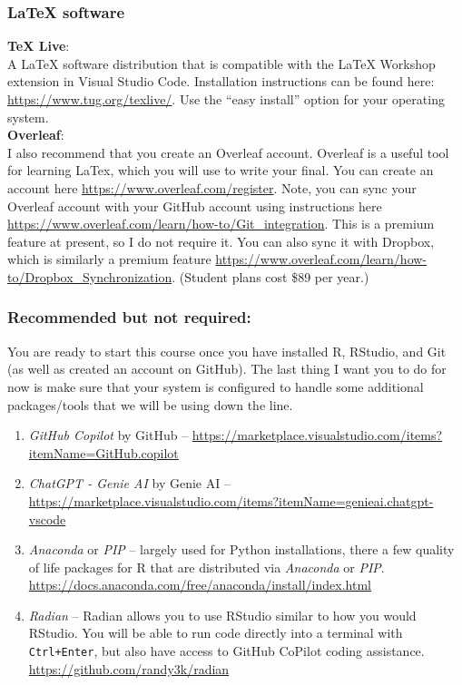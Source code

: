 \documentclass[11pt]{article}
\begin{document}
\vspace{-0.25cm}
\subsubsection*{LaTeX software}
\textbf{TeX Live}: \\
A LaTeX software distribution that is compatible with the LaTeX Workshop extension in Visual Studio Code. Installation instructions can be found here: \url{https://www.tug.org/texlive/}. Use the ``easy install'' option for your operating system. \\

\hspace{-0.25cm} \textbf{Overleaf}: \\
I also recommend that you create an Overleaf account. Overleaf is a useful tool for learning LaTex, which you will use to write your final. You can create an account here \url{https://www.overleaf.com/register}. Note, you can sync your Overleaf account with your GitHub account using instructions here \url{https://www.overleaf.com/learn/how-to/Git_integration}. This is a premium feature at present, so I do not require it. You can also sync it with Dropbox, which is similarly a premium feature \url{https://www.overleaf.com/learn/how-to/Dropbox_Synchronization}. (Student plans cost \$89 per year.)

\vspace{-0.25cm}
\subsubsection*{Recommended but not required:}

You are ready to start this course once you have installed R, RStudio, and Git (as well as created an account on GitHub). The last thing I want you to do for now is make sure that your system is configured to handle some additional packages/tools that we will be using down the line. 

\begin{enumerate}
  \item \textit{GitHub Copilot} by GitHub -- \url{https://marketplace.visualstudio.com/items?itemName=GitHub.copilot}
  \item \textit{ChatGPT - Genie AI} by Genie AI -- \url{https://marketplace.visualstudio.com/items?itemName=genieai.chatgpt-vscode}
  \item \textit{Anaconda} or \textit{PIP} -- largely used for Python installations, there a few quality of life packages for R that are distributed via \textit{Anaconda} or \textit{PIP}. \url{https://docs.anaconda.com/free/anaconda/install/index.html}
  \item \textit{Radian} -- Radian allows you to use RStudio similar to how you would RStudio. You will be able to run code directly into a terminal with \texttt{Ctrl+Enter}, but also have access to GitHub CoPilot coding assistance. \url{https://github.com/randy3k/radian}
\end{enumerate}
\end{document}

